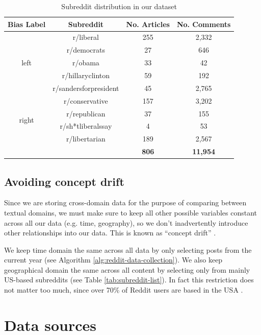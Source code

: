 \begin{table}[ht]
    \centering
    \begin{tabular}{|c|c|c|c|}
        \hline
        \textbf{Bias Label} & \textbf{Subreddit} & \textbf{No. Articles} & \textbf{No. Comments} \\
        \hline
        \multirow{5}{2em}{left} & r/liberal & 255 & 2,332 \\
        & r/democrats & 27 & 646 \\
        & r/obama & 33 & 42 \\
        & r/hillaryclinton & 59 & 192 \\
        & r/sandersforpresident & 45 & 2,765 \\
        \hline
        \multirow{4}{2em}{right} & r/conservative & 157 & 3,202 \\
        & r/republican & 37 & 155 \\
        & r/sh*tliberalssay & 4 & 53 \\
        & r/libertarian & 189 & 2,567 \\
        \hline
        \multicolumn{2}{c|}{} & \textbf{806} & \textbf{11,954} \\
        \cline{3-4}
    \end{tabular}
    \caption{Subreddit distribution in our dataset}
    \label{tab:subreddit-distribution}
\end{table}

\subsection{Avoiding concept drift}

Since we are storing cross-domain data for the purpose of comparing between textual domains, we must make sure to keep all other possible variables constant across all our data (e.g. time, geography), so we don't inadvertently introduce other relationships into our data. This is known as ``concept drift'' \cite{concept-drift}.

We keep time domain the same across all data by only selecting posts from the current year (see Algorithm \ref{alg:reddit-data-collection}). We also keep geographical domain the same across all content by selecting only from mainly US-based subreddits (see Table \ref{tab:subreddit-list}). In fact this restriction does not matter too much, since over 70\% of Reddit users are based in the USA \cite{sattelberg}.

\section{Data sources}

